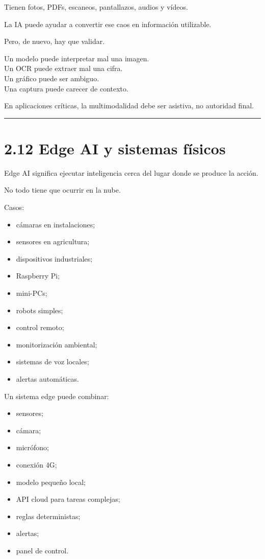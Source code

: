 Tienen fotos, PDFs, escaneos, pantallazos, audios y vídeos.

La IA puede ayudar a convertir ese caos en información utilizable.

Pero, de nuevo, hay que validar.

Un modelo puede interpretar mal una imagen.\\
Un OCR puede extraer mal una cifra.\\
Un gráfico puede ser ambiguo.\\
Una captura puede carecer de contexto.

En aplicaciones críticas, la multimodalidad debe ser asistiva, no
autoridad final.

\begin{center}\rule{0.5\linewidth}{0.5pt}\end{center}

\section{2.12 Edge AI y sistemas
físicos}\label{edge-ai-y-sistemas-fuxedsicos}

Edge AI significa ejecutar inteligencia cerca del lugar donde se produce
la acción.

No todo tiene que ocurrir en la nube.

Casos:

\begin{itemize}
\tightlist
\item
  cámaras en instalaciones;
\item
  sensores en agricultura;
\item
  dispositivos industriales;
\item
  Raspberry Pi;
\item
  mini-PCs;
\item
  robots simples;
\item
  control remoto;
\item
  monitorización ambiental;
\item
  sistemas de voz locales;
\item
  alertas automáticas.
\end{itemize}

Un sistema edge puede combinar:

\begin{itemize}
\tightlist
\item
  sensores;
\item
  cámara;
\item
  micrófono;
\item
  conexión 4G;
\item
  modelo pequeño local;
\item
  API cloud para tareas complejas;
\item
  reglas deterministas;
\item
  alertas;
\item
  panel de control.
\end{itemize}

